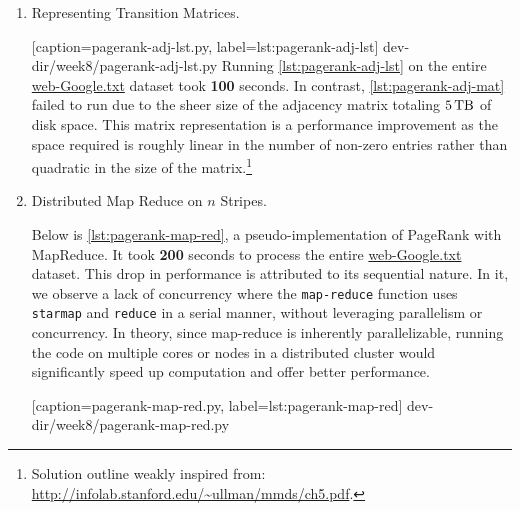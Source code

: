 \documentclass{article}
\begin{document}
\begin{enumerate}[leftmargin={*}, font={\bf}, label={\arabic*.}, ref={\arabic*}]
    \begin{enumerate}[leftmargin={*}, label={\arabic*.}]
      \item
        Representing Transition Matrices.
        
          [caption={\sf pagerank-adj-lst.py}, label={lst:pagerank-adj-lst}]
          {dev-dir/week8/pagerank-adj-lst.py}
        Running \autoref{lst:pagerank-adj-lst} on the entire
        \href{https://snap.stanford.edu/data/web-Google.html}{\url{web-Google.txt}}
        dataset took {\bf 100} seconds. In contrast, \autoref{lst:pagerank-adj-mat}
        failed to run due to the sheer size of the adjacency matrix totaling
        $\SI{5}{\tera\byte}$ of disk space. This matrix representation is a performance
        improvement as the space required is roughly linear in the number of non-zero
        entries rather than quadratic in the size of the matrix.\footnote{
          Solution outline weakly inspired from:
          \href{
            http://infolab.stanford.edu/~ullman/mmds/ch5.pdf
          }{\url{http://infolab.stanford.edu/~ullman/mmds/ch5.pdf}}.
        }

      \item
        Distributed Map Reduce on $n$ Stripes. \par
        Below is \autoref{lst:pagerank-map-red}, a pseudo-implementation of
        {\sf PageRank} with MapReduce. It took {\bf 200} seconds to process the entire
        \href{https://snap.stanford.edu/data/web-Google.html}{\url{web-Google.txt}}
        dataset. This drop in performance is attributed to its sequential nature. In it,
        we observe a lack of concurrency where the {\tt map-reduce} function uses
        {\tt starmap} and {\tt reduce} in a serial manner, without leveraging parallelism
        or concurrency. In theory, since map-reduce is inherently parallelizable, running
        the code on multiple cores or nodes in a distributed cluster would significantly
        speed up computation and offer better performance.
        
        \newpage
        
        
          [caption={\sf pagerank-map-red.py}, label={lst:pagerank-map-red}]
          {dev-dir/week8/pagerank-map-red.py}
    \end{enumerate}
\end{enumerate}
\end{document}
